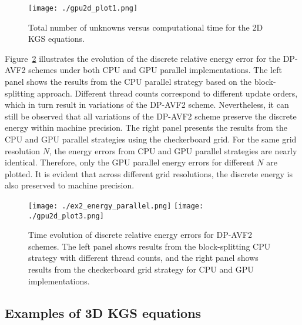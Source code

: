 \documentclass[fleqn,11pt]{elsarticle}
\numberwithin{equation}{section}
\begin{document}
\begin{figure}[H]
	\centering
		\texttt{[image: ./gpu2d\_plot1.png]}
	\caption{Total number of unknowns versus computational time for the 2D KGS equations.}\label{fig:gpu2d_plot}
\end{figure}



Figure~\ref{parallel-efficiency-energy-2d} illustrates the evolution of the discrete relative energy error for the DP-AVF2 schemes under both CPU and GPU parallel implementations. The left panel shows the results from the CPU parallel strategy based on the block-splitting approach. Different thread counts correspond to different update orders, which in turn result in variations of the DP-AVF2 scheme. Nevertheless, it can still be observed that all variations of the DP-AVF2 scheme preserve the discrete energy within machine precision. The right panel presents the results from the CPU and GPU parallel strategies using the checkerboard grid. For the same grid resolution $N$, the energy errors from CPU and GPU parallel strategies are nearly identical. Therefore, only the GPU parallel energy errors for different $N$ are plotted. It is evident that across different grid resolutions, the discrete energy is also preserved to machine precision. 



\begin{figure}[H]
	\centering
		\texttt{[image: ./ex2\_energy\_parallel.png]}
		\texttt{[image: ./gpu2d\_plot3.png]}
	\caption{Time evolution of discrete relative energy errors for DP-AVF2 schemes. The left panel shows results from the block-splitting CPU strategy with different thread counts, and the right panel shows results from the checkerboard grid strategy for CPU and GPU implementations.}\label{parallel-efficiency-energy-2d}
\end{figure}








\subsection{Examples of 3D KGS equations}
\end{document}
